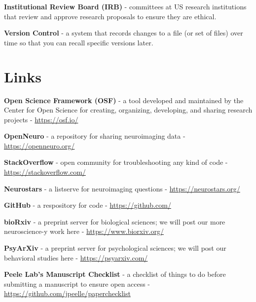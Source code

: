 \documentclass[
]{book}
\begin{document}
\textbf{Institutional Review Board (IRB)} - committees at US research institutions that review and approve research proposals to ensure they are ethical.

\textbf{Version Control} - a system that records changes to a file (or set of files) over time so that you can recall specific versions later.

\hypertarget{links}{%
\section{Links}\label{links}}

\textbf{Open Science Framework (OSF)} - a tool developed and maintained by the Center for Open Science for creating, organizing, developing, and sharing research projects - \url{https://osf.io/}

\textbf{OpenNeuro} - a repository for sharing neuroimaging data - \url{https://openneuro.org/}

\textbf{StackOverflow} - open community for troubleshooting any kind of code - \url{https://stackoverflow.com/}

\textbf{Neurostars} - a listserve for neuroimaging questions - \url{https://neurostars.org/}

\textbf{GitHub} - a respository for code - \url{https://github.com/}

\textbf{bioRxiv} - a preprint server for biological sciences; we will post our more neuroscience-y work here - \url{https://www.biorxiv.org/}

\textbf{PsyArXiv} - a preprint server for psychological sciences; we will post our behavioral studies here - \url{https://psyarxiv.com/}

\textbf{Peele Lab's Manuscript Checklist} - a checklist of things to do before submitting a manuscript to ensure open access - \url{https://github.com/jpeelle/paperchecklist}

  
\end{document}
